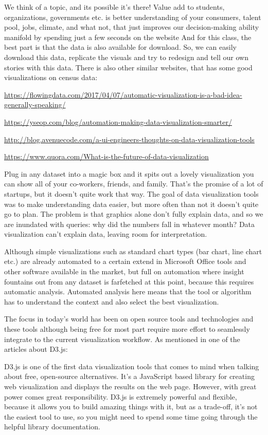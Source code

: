 \documentclass[]{book}
\theoremstyle{definition}
\theoremstyle{definition}
\theoremstyle{definition}
\theoremstyle{remark}
\begin{document}
We think of a topic, and its possible it's there! Value add to students,
organizations, governments etc. is better understanding of your
consumers, talent pool, jobs, climate, and what not, that just improves
our decision-making ability manifold by spending just a few seconds on
the website And for this class, the best part is that the data is also
available for download. So, we can easily download this data, replicate
the visuals and try to redesign and tell our own stories with this data.
There is also other similar websites, that has some good visualizations
on census data: \citep{CensusDataViz}

\url{https://flowingdata.com/2017/04/07/automatic-visualization-is-a-bad-idea-generally-speaking/}

\url{https://yseop.com/blog/automation-making-data-visualization-smarter/}

\url{http://blog.avenuecode.com/a-ui-engineers-thoughts-on-data-visualization-tools}

\url{https://www.quora.com/What-is-the-future-of-data-visualization}

Plug in any dataset into a magic box and it spits out a lovely
visualization you can show all of your co-workers, friends, and family.
That's the promise of a lot of startups, but it doesn't quite work that
way. The goal of data visualization tools was to make understanding data
easier, but more often than not it doesn't quite go to plan. The problem
is that graphics alone don't fully explain data, and so we are inundated
with queries: why did the numbers fall in whatever month? Data
visualization can't explain data, leaving room for interpretation.

Although simple visualizations such as standard chart types (bar chart,
line chart etc.) are already automated to a certain extend in Microsoft
Office tools and other software available in the market, but full on
automation where insight fountains out from any dataset is farfetched at
this point, because this requires automatic analysis. Automated analysis
here means that the tool or algorithm has to understand the context and
also select the best visualization.

The focus in today's world has been on open source tools and
technologies and these tools although being free for most part require
more effort to seamlessly integrate to the current visualization
workflow. As mentioned in one of the articles about D3.js:

D3.js is one of the first data visualization tools that comes to mind
when talking about free, open-source alternatives. It's a JavaScript
based library for creating web visualization and displays the results on
the web page. However, with great power comes great responsibility.
D3.js is extremely powerful and flexible, because it allows you to build
amazing things with it, but as a trade-off, it's not the easiest tool to
use, so you might need to spend some time going through the helpful
library documentation.
\end{document}
